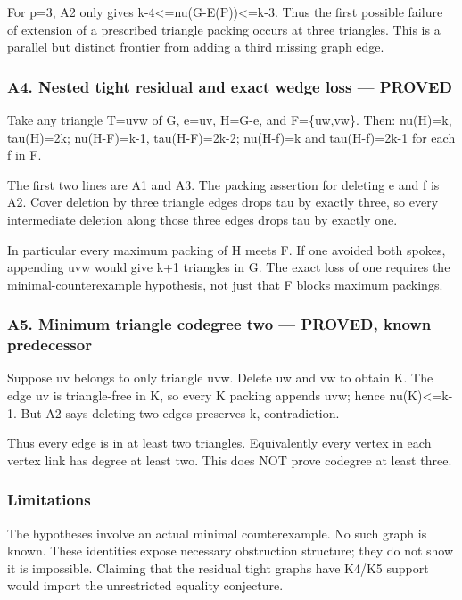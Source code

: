 \documentclass[11pt]{article}
\begin{document}
For p=3, A2 only gives k-4\textless=nu(G-E(P))\textless=k-3. Thus the first possible failure of extension of a prescribed triangle packing occurs at three triangles. This is a parallel but distinct frontier from adding a third missing graph edge.

\subsubsection{A4. Nested tight residual and exact wedge loss --- PROVED}\label{a4.-nested-tight-residual-and-exact-wedge-loss-proved}

Take any triangle T=uvw of G, e=uv, H=G-e, and F=\{uw,vw\}. Then: nu(H)=k, tau(H)=2k; nu(H-F)=k-1, tau(H-F)=2k-2; nu(H-f)=k and tau(H-f)=2k-1 for each f in F.

The first two lines are A1 and A3. The packing assertion for deleting e and f is A2. Cover deletion by three triangle edges drops tau by exactly three, so every intermediate deletion along those three edges drops tau by exactly one.

In particular every maximum packing of H meets F. If one avoided both spokes, appending uvw would give k+1 triangles in G. The exact loss of one requires the minimal-counterexample hypothesis, not just that F blocks maximum packings.

\subsubsection{A5. Minimum triangle codegree two --- PROVED, known predecessor}\label{a5.-minimum-triangle-codegree-two-proved-known-predecessor}

Suppose uv belongs to only triangle uvw. Delete uw and vw to obtain K. The edge uv is triangle-free in K, so every K packing appends uvw; hence nu(K)\textless=k-1. But A2 says deleting two edges preserves k, contradiction.

Thus every edge is in at least two triangles. Equivalently every vertex in each vertex link has degree at least two. This does NOT prove codegree at least three.

\subsubsection{Limitations}\label{limitations}

The hypotheses involve an actual minimal counterexample. No such graph is known. These identities expose necessary obstruction structure; they do not show it is impossible. Claiming that the residual tight graphs have K4/K5 support would import the unrestricted equality conjecture.
\end{document}
